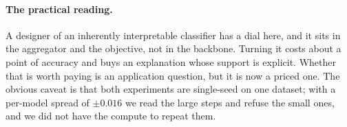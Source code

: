 \paragraph{The practical reading.}
A designer of an inherently interpretable classifier has a dial here, and it sits in the aggregator
and the objective, not in the backbone. Turning it costs about a point of accuracy and buys an
explanation whose support is explicit. Whether that is worth paying is an application question, but
it is now a priced one. The obvious caveat is that both experiments are single-seed on one dataset;
with a per-model spread of $\pm0.016$ we read the large steps and refuse the small ones, and we did
not have the compute to repeat them.
